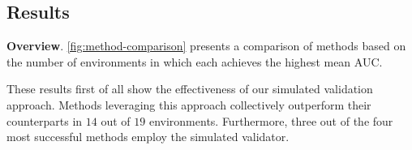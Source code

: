 




\subsection{Results}

\textbf{Overview}.
\autoref{fig:method-comparison} presents a comparison of methods based on the number of environments in which each achieves the highest mean AUC.

These results first of all show the effectiveness of our simulated validation approach. 
Methods leveraging this approach collectively outperform their counterparts in $14$ out of $19$ environments. 
Furthermore, three out of the four most successful methods employ the simulated validator. 







